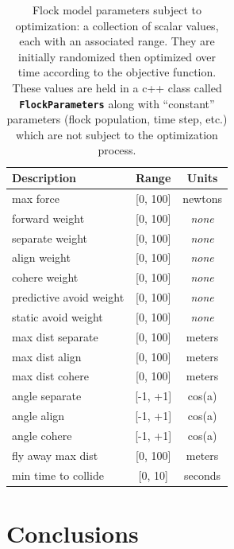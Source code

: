 \documentclass[letterpaper]{article}
\newcommand{\code}[1]{\textbf{\small \texttt{#1}}}
\begin{document}
\begin{table}[]
\centering
\begin{tabular}{ | l | c | c | }
    \hline
    \textbf{Description} & \textbf{Range} & \textbf{Units} \\
    \hline
    max force & [0, 100] & newtons \\
    forward weight & [0, 100] & \textit{none} \\
    separate weight & [0, 100] & \textit{none} \\
    align weight & [0, 100] & \textit{none} \\
    cohere weight & [0, 100] & \textit{none} \\
    predictive avoid weight & [0, 100] & \textit{none} \\
    static avoid weight & [0, 100] & \textit{none} \\
    max dist separate & [0, 100] & meters \\
    max dist align & [0, 100] & meters \\
    max dist cohere & [0, 100] & meters \\
    angle separate & [-1, +1] & cos(a) \\
    angle align & [-1, +1] & cos(a) \\
    angle cohere & [-1, +1] & cos(a) \\
    fly away max dist & [0, 100] & meters \\
    min time to collide & [0, 10] & seconds \\
    \hline
\end{tabular}
\caption{Flock model parameters subject to optimization: a collection of scalar values, each with an associated range. They are initially randomized then optimized over time according to the objective function. These values are held in a c++ class called \code{FlockParameters} along with ``constant'' parameters (flock population, time step, etc.) which are not subject to the optimization process.}
\label{table:flock-parameters}
\end{table}


\section{Conclusions}
\label{sec:Conclusions}
\end{document}
